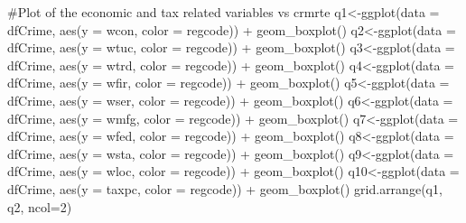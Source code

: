\documentclass[]{article}
\newenvironment{Shaded}{}{}
\newcommand{\CommentTok}[1]{\textcolor[rgb]{0.00,0.50,0.00}{#1}}
\newcommand{\DataTypeTok}[1]{#1}
\newcommand{\DecValTok}[1]{#1}
\newcommand{\KeywordTok}[1]{\textcolor[rgb]{0.00,0.00,1.00}{#1}}
\newcommand{\NormalTok}[1]{#1}
\newcommand{\OperatorTok}[1]{#1}
\newcommand{\StringTok}[1]{\textcolor[rgb]{0.00,0.50,0.50}{#1}}
\begin{document}
\begin{Shaded}
\begin{Highlighting}[]
\CommentTok{#Plot of the economic and tax related variables vs crmrte}
\NormalTok{q1<-}\KeywordTok{ggplot}\NormalTok{(}\DataTypeTok{data =}\NormalTok{ dfCrime, }\KeywordTok{aes}\NormalTok{(}\DataTypeTok{y =}\NormalTok{ wcon, }\DataTypeTok{color =}\NormalTok{ regcode)) }\OperatorTok{+}\StringTok{ }
\StringTok{      }\KeywordTok{geom_boxplot}\NormalTok{()}
\NormalTok{q2<-}\KeywordTok{ggplot}\NormalTok{(}\DataTypeTok{data =}\NormalTok{ dfCrime, }\KeywordTok{aes}\NormalTok{(}\DataTypeTok{y =}\NormalTok{ wtuc, }\DataTypeTok{color =}\NormalTok{ regcode)) }\OperatorTok{+}\StringTok{ }
\StringTok{      }\KeywordTok{geom_boxplot}\NormalTok{()}
\NormalTok{q3<-}\KeywordTok{ggplot}\NormalTok{(}\DataTypeTok{data =}\NormalTok{ dfCrime, }\KeywordTok{aes}\NormalTok{(}\DataTypeTok{y =}\NormalTok{ wtrd, }\DataTypeTok{color =}\NormalTok{ regcode)) }\OperatorTok{+}\StringTok{ }
\StringTok{      }\KeywordTok{geom_boxplot}\NormalTok{()}
\NormalTok{q4<-}\KeywordTok{ggplot}\NormalTok{(}\DataTypeTok{data =}\NormalTok{ dfCrime, }\KeywordTok{aes}\NormalTok{(}\DataTypeTok{y =}\NormalTok{ wfir, }\DataTypeTok{color =}\NormalTok{ regcode)) }\OperatorTok{+}\StringTok{ }
\StringTok{      }\KeywordTok{geom_boxplot}\NormalTok{()}
\NormalTok{q5<-}\KeywordTok{ggplot}\NormalTok{(}\DataTypeTok{data =}\NormalTok{ dfCrime, }\KeywordTok{aes}\NormalTok{(}\DataTypeTok{y =}\NormalTok{ wser, }\DataTypeTok{color =}\NormalTok{ regcode)) }\OperatorTok{+}\StringTok{ }
\StringTok{      }\KeywordTok{geom_boxplot}\NormalTok{()}
\NormalTok{q6<-}\KeywordTok{ggplot}\NormalTok{(}\DataTypeTok{data =}\NormalTok{ dfCrime, }\KeywordTok{aes}\NormalTok{(}\DataTypeTok{y =}\NormalTok{ wmfg, }\DataTypeTok{color =}\NormalTok{ regcode)) }\OperatorTok{+}\StringTok{ }
\StringTok{      }\KeywordTok{geom_boxplot}\NormalTok{()}
\NormalTok{q7<-}\KeywordTok{ggplot}\NormalTok{(}\DataTypeTok{data =}\NormalTok{ dfCrime, }\KeywordTok{aes}\NormalTok{(}\DataTypeTok{y =}\NormalTok{ wfed, }\DataTypeTok{color =}\NormalTok{ regcode)) }\OperatorTok{+}\StringTok{ }
\StringTok{      }\KeywordTok{geom_boxplot}\NormalTok{()}
\NormalTok{q8<-}\KeywordTok{ggplot}\NormalTok{(}\DataTypeTok{data =}\NormalTok{ dfCrime, }\KeywordTok{aes}\NormalTok{(}\DataTypeTok{y =}\NormalTok{ wsta, }\DataTypeTok{color =}\NormalTok{ regcode)) }\OperatorTok{+}\StringTok{ }
\StringTok{      }\KeywordTok{geom_boxplot}\NormalTok{()}
\NormalTok{q9<-}\KeywordTok{ggplot}\NormalTok{(}\DataTypeTok{data =}\NormalTok{ dfCrime, }\KeywordTok{aes}\NormalTok{(}\DataTypeTok{y =}\NormalTok{ wloc, }\DataTypeTok{color =}\NormalTok{ regcode)) }\OperatorTok{+}\StringTok{ }
\StringTok{      }\KeywordTok{geom_boxplot}\NormalTok{()}
\NormalTok{q10<-}\KeywordTok{ggplot}\NormalTok{(}\DataTypeTok{data =}\NormalTok{ dfCrime, }\KeywordTok{aes}\NormalTok{(}\DataTypeTok{y =}\NormalTok{ taxpc, }\DataTypeTok{color =}\NormalTok{ regcode)) }\OperatorTok{+}\StringTok{ }
\StringTok{      }\KeywordTok{geom_boxplot}\NormalTok{()}
\KeywordTok{grid.arrange}\NormalTok{(q1, q2, }\DataTypeTok{ncol=}\DecValTok{2}\NormalTok{)}
\end{Highlighting}
\end{Shaded}
\end{document}
